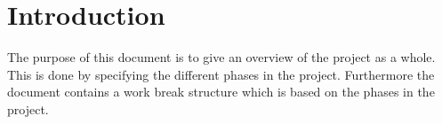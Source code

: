 \chapter{Introduction}
The purpose of this document is to give an overview of the project as a whole. This is done by specifying the different phases in the project. Furthermore the document contains a work break structure which is based on the phases in the project. 



